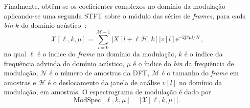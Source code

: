 Finalmente, obtêm-se os coeficientes complexos no domínio da modulação
aplicando-se uma segunda STFT sobre o módulo das séries de \textit{frames}, para
cada \textit{bin} $k$ do domínio acústico~\cite{paliwal2015}:
\begin{equation}
      \mathcal{X}[\ell, k, \mu] = \sum_{l = 0}^{\mathcal{M}-1}\left\lvert X[l+\ell \mathcal{H},k] \right\rvert v[l]{\mathrm{e}^{-2\mathrm{j}\pi \mu l/\mathcal{N}}},      
\end{equation}
no qual $\ell$ é o índice do \textit{frame} no domínio da modulação, $k$ é o
 índice da frequência advinda do domínio acústico, $\mu$ é o índice do
 \textit{bin} da frequência de modulação, $\mathcal{N}$ é o número de amostras
 da DFT, $\mathcal{M}$ é o tamanho do \textit{frame} em amostras e $\mathcal{H}$
 é o deslocamento da janela de análise $v[l]$ no domínio da modulação, em
 amostras. O espectrograma de modulação é dado por
\begin{equation}
\mathrm{ModSpec}[\ell, k, \mu] = \left\lvert \mathcal{X}[\ell, k, \mu]\right\rvert. 
\end{equation}


